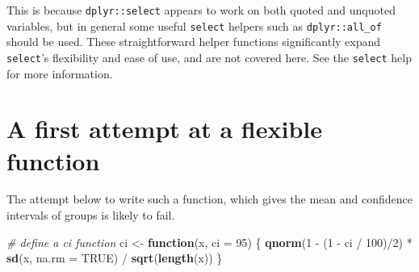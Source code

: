 \documentclass[]{book}
\newenvironment{Shaded}{}{}
\newcommand{\CommentTok}[1]{\textcolor[rgb]{0.38,0.63,0.69}{\textit{#1}}}
\newcommand{\ControlFlowTok}[1]{\textcolor[rgb]{0.00,0.44,0.13}{\textbf{#1}}}
\newcommand{\DataTypeTok}[1]{\textcolor[rgb]{0.56,0.13,0.00}{#1}}
\newcommand{\DecValTok}[1]{\textcolor[rgb]{0.25,0.63,0.44}{#1}}
\newcommand{\KeywordTok}[1]{\textcolor[rgb]{0.00,0.44,0.13}{\textbf{#1}}}
\newcommand{\NormalTok}[1]{#1}
\newcommand{\OperatorTok}[1]{\textcolor[rgb]{0.40,0.40,0.40}{#1}}
\newcommand{\OtherTok}[1]{\textcolor[rgb]{0.00,0.44,0.13}{#1}}
\newcommand{\StringTok}[1]{\textcolor[rgb]{0.25,0.44,0.63}{#1}}
\begin{document}
This is because \texttt{dplyr::select} appears to work on both quoted and unquoted variables, but in general some useful \texttt{select} helpers such as \texttt{dplyr::all\_of} should be used. These straightforward helper functions significantly expand \texttt{select}'s flexibility and ease of use, and are not covered here. See the \texttt{select} help for more information.

\hypertarget{a-first-attempt-at-a-flexible-function}{%
\section{A first attempt at a flexible function}\label{a-first-attempt-at-a-flexible-function}}

The attempt below to write such a function, which gives the mean and confidence intervals of groups is likely to fail.

\begin{Shaded}
\begin{Highlighting}[]
\CommentTok{# define a ci function}
\NormalTok{ci <-}\StringTok{ }\ControlFlowTok{function}\NormalTok{(x, }\DataTypeTok{ci =} \DecValTok{95}\NormalTok{) \{}
  \KeywordTok{qnorm}\NormalTok{(}\DecValTok{1} \OperatorTok{-}\StringTok{ }\NormalTok{(}\DecValTok{1} \OperatorTok{-}\StringTok{ }\NormalTok{ci }\OperatorTok{/}\StringTok{ }\DecValTok{100}\NormalTok{)}\OperatorTok{/}\DecValTok{2}\NormalTok{) }\OperatorTok{*}\StringTok{ }\KeywordTok{sd}\NormalTok{(x, }\DataTypeTok{na.rm =} \OtherTok{TRUE}\NormalTok{) }\OperatorTok{/}\StringTok{ }\KeywordTok{sqrt}\NormalTok{(}\KeywordTok{length}\NormalTok{(x))}
\NormalTok{\}}
\end{Highlighting}
\end{Shaded}

\begin{Shaded}
\end{Shaded}
\end{document}
